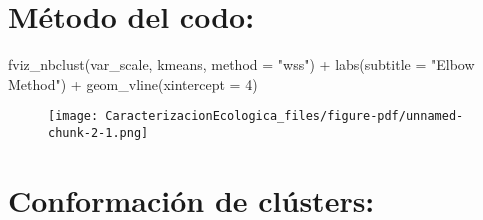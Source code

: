 \documentclass[
  10pt,
  letterpaper,
  DIV=11,
  numbers=noendperiod]{scrreprt}
\newenvironment{Shaded}{\begin{snugshade}}{\end{snugshade}}
\newcommand{\AttributeTok}[1]{\textcolor[rgb]{0.40,0.45,0.13}{#1}}
\newcommand{\DecValTok}[1]{\textcolor[rgb]{0.68,0.00,0.00}{#1}}
\newcommand{\FunctionTok}[1]{\textcolor[rgb]{0.28,0.35,0.67}{#1}}
\newcommand{\NormalTok}[1]{\textcolor[rgb]{0.00,0.23,0.31}{#1}}
\newcommand{\SpecialCharTok}[1]{\textcolor[rgb]{0.37,0.37,0.37}{#1}}
\newcommand{\StringTok}[1]{\textcolor[rgb]{0.13,0.47,0.30}{#1}}
\begin{document}
\hypertarget{muxe9todo-del-codo}{%
\section{Método del codo:}\label{muxe9todo-del-codo}}

\begin{Shaded}
\begin{Highlighting}[numbers=left,,]
\FunctionTok{fviz\_nbclust}\NormalTok{(var\_scale,}
\NormalTok{             kmeans, }
             \AttributeTok{method =} \StringTok{"wss"}\NormalTok{) }\SpecialCharTok{+}
  \FunctionTok{labs}\NormalTok{(}\AttributeTok{subtitle =} \StringTok{"Elbow Method"}\NormalTok{) }\SpecialCharTok{+}
  \FunctionTok{geom\_vline}\NormalTok{(}\AttributeTok{xintercept =} \DecValTok{4}\NormalTok{)}
\end{Highlighting}
\end{Shaded}

\begin{figure}[tb]

{\centering \texttt{[image: CaracterizacionEcologica\_files/figure-pdf/unnamed-chunk-2-1.png]}

}

\end{figure}

\hypertarget{conformaciuxf3n-de-cluxfasters}{%
\section{Conformación de
clústers:}\label{conformaciuxf3n-de-cluxfasters}}
\end{document}
